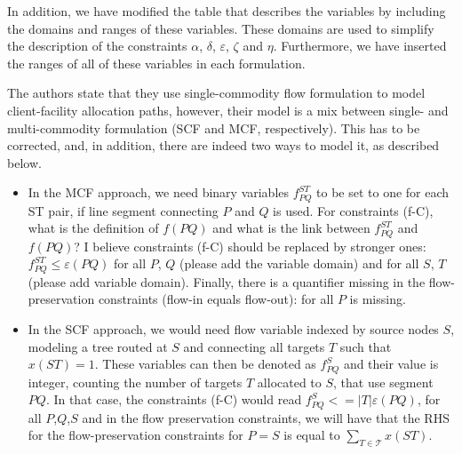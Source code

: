 \documentclass{article}
\newenvironment{reviewer}{\setcounter{pointcounter}{1}}{}
\newcommand{\point}{\text{{\selectfont \thepointcounter} \stepcounter{pointcounter}}}
\begin{document}
\begin{reviewer}
\begin{tcolorbox}[breakable,enhanced,coltitle=black,colback=green!5!white,colframe=green!75!black,title=\textbf{Answer R2.\point},borderline={1pt}{0pt}{black},boxrule=0pt]
			In addition, we have modified the table that describes the variables by including the domains and ranges of these variables. These domains are used to simplify the description of the constraints $\alpha$, $\delta$, $\varepsilon$, $\zeta$ and $\eta$. Furthermore, we have inserted the ranges of all of these variables in each formulation.
			
			
		\end{tcolorbox}
			
		\begin{itshape}
			 The authors state that they use single-commodity flow formulation to model client-facility allocation paths, however, their model is a mix between single- and multi-commodity formulation (SCF and MCF, respectively). This has to be corrected, and, in addition, there are indeed two ways to model it, as described below.
			
			\begin{itemize}
				\item In the MCF approach, we need binary variables $f^{ST}_{PQ}$ to be set to one for each ST pair, if line segment connecting $P$ and $Q$ is used. For constraints (f-C), what is the definition of $f(PQ)$ and what is the link between $f^{ST}_{PQ}$ and $f(PQ)$? I believe constraints (f-C) should be replaced by stronger ones: $f^{ST}_{PQ}\leq \varepsilon(PQ)$ for all $P$, $Q$ (please add the variable domain) and for all $S$, $T$ (please add variable domain). Finally, there is a quantifier missing in the flow-preservation constraints (flow-in equals flow-out): for all $P$ is missing.
				\item In the SCF approach, we would need flow variable indexed by source nodes $S$, modeling a tree routed at $S$ and connecting all targets $T$ such that $x(ST)=1$. These variables can then be denoted as $f^S_{PQ}$ and their value is integer, counting the number of targets $T$ allocated to $S$, that use segment $PQ$. In that case, the constraints (f-C) would read $f^S_{PQ} <= |T| \varepsilon(PQ)$, for all $P$,$Q$,$S$ and in the flow preservation constraints, we will have that the RHS for the flow-preservation constraints for $P=S$ is equal to $\sum_{T \in \mathcal T} x(ST)$.
			\end{itemize}
		
		\end{itshape}



\end{reviewer}
\end{document}

